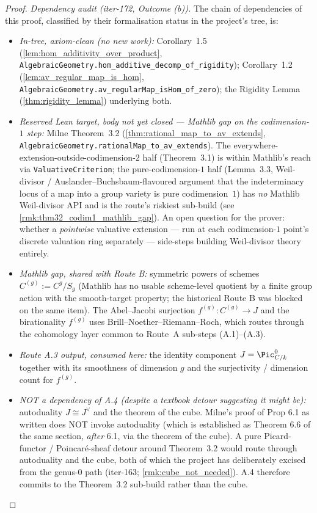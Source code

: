 \begin{proof}
  \medskip
  \emph{Dependency audit (iter-172, Outcome (b)).} The chain of dependencies of this proof, classified by their formalisation status in the project's tree, is:
  \begin{itemize}
    \item \emph{In-tree, axiom-clean (no new work):} Corollary~1.5 (\cref{lem:hom_additivity_over_product}, \texttt{AlgebraicGeometry.hom\_additive\_decomp\_of\_rigidity}); Corollary~1.2 (\cref{lem:av_regular_map_is_hom}, \texttt{AlgebraicGeometry.av\_regularMap\_isHom\_of\_zero}); the Rigidity Lemma (\cref{thm:rigidity_lemma}) underlying both.
    \item \emph{Reserved Lean target, body not yet closed --- Mathlib gap on the codimension-\(1\) step:} Milne Theorem~3.2 (\cref{thm:rational_map_to_av_extends}, \texttt{AlgebraicGeometry.rationalMap\_to\_av\_extends}). The everywhere-extension-outside-codimension-\(2\) half (Theorem~3.1) is within Mathlib's reach via \texttt{ValuativeCriterion}; the pure-codimension-\(1\) half (Lemma~3.3, Weil-divisor / Auslander--Buchsbaum-flavoured argument that the indeterminacy locus of a map into a group variety is pure codimension~\(1\)) has \emph{no} Mathlib Weil-divisor API and is the route's riskiest sub-build (see \cref{rmk:thm32_codim1_mathlib_gap}). An open question for the prover: whether a \emph{pointwise} valuative extension --- run at each codimension-\(1\) point's discrete valuation ring separately --- side-steps building Weil-divisor theory entirely.
    \item \emph{Mathlib gap, shared with Route B:} symmetric powers of schemes \(C^{(g)} := C^g / S_g\) (Mathlib has no usable scheme-level quotient by a finite group action with the smooth-target property; the historical Route B was blocked on the same item). The Abel--Jacobi surjection \(f^{(g)} \colon C^{(g)} \to J\) and the birationality \(f^{(g)}\) uses Brill--Noether--Riemann--Roch, which routes through the cohomology layer common to Route~A sub-steps (A.1)--(A.3).
    \item \emph{Route A.3 output, consumed here:} the identity component \(J = \Pic^0_{C/k}\) together with its smoothness of dimension \(g\) and the surjectivity / dimension count for \(f^{(g)}\).
    \item \emph{NOT a dependency of A.4 (despite a textbook detour suggesting it might be):} autoduality \(J \cong J^\vee\) and the theorem of the cube. Milne's proof of Prop 6.1 as written does NOT invoke autoduality (which is established as Theorem 6.6 of the same section, \emph{after} 6.1, via the theorem of the cube). A pure Picard-functor / Poincar\'e-sheaf detour around Theorem~3.2 would route through autoduality and the cube, both of which the project has deliberately excised from the genus-\(0\) path (iter-163; \cref{rmk:cube_not_needed}). A.4 therefore commits to the Theorem~3.2 sub-build rather than the cube.

\end{itemize}
\end{proof}
